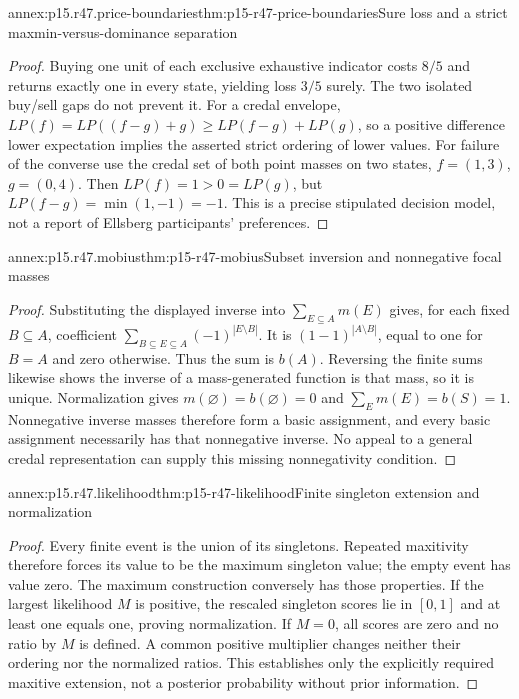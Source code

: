 \begin{annexitem}{annex:p15.r47.price-boundaries}{thm:p15-r47-price-boundaries}{Sure loss and a strict maxmin-versus-dominance separation}
\begin{proof}
Buying one unit of each exclusive exhaustive indicator costs \(8/5\)
and returns exactly one in every state, yielding loss \(3/5\) surely.
The two isolated buy/sell gaps do not prevent it. For a credal envelope,
\(LP(f)=LP((f-g)+g)\geq LP(f-g)+LP(g)\), so a positive difference
lower expectation implies the asserted strict ordering of lower values.
For failure of the converse use the credal set of both point masses on
two states, \(f=(1,3)\), \(g=(0,4)\). Then
\(LP(f)=1>0=LP(g)\), but \(LP(f-g)=\min(1,-1)=-1\).
This is a precise stipulated decision model, not a report of Ellsberg
participants' preferences.
\end{proof}\end{annexitem}

\begin{annexitem}{annex:p15.r47.mobius}{thm:p15-r47-mobius}{Subset inversion and nonnegative focal masses}
\begin{proof}
Substituting the displayed inverse into \(\sum_{E\subseteq A}m(E)\)
gives, for each fixed \(B\subseteq A\), coefficient
\(\sum_{B\subseteq E\subseteq A}(-1)^{|E\setminus B|}\).
It is \((1-1)^{|A\setminus B|}\), equal to one for \(B=A\) and
zero otherwise. Thus the sum is \(b(A)\). Reversing the finite sums
likewise shows the inverse of a mass-generated function is that mass,
so it is unique. Normalization gives \(m(\varnothing)=b(\varnothing)=0\)
and \(\sum_E m(E)=b(S)=1\). Nonnegative inverse masses therefore
form a basic assignment, and every basic assignment necessarily has
that nonnegative inverse. No appeal to a general credal representation
can supply this missing nonnegativity condition.
\end{proof}\end{annexitem}

\begin{annexitem}{annex:p15.r47.likelihood}{thm:p15-r47-likelihood}{Finite singleton extension and normalization}
\begin{proof}
Every finite event is the union of its singletons. Repeated maxitivity
therefore forces its value to be the maximum singleton value; the empty
event has value zero. The maximum construction conversely has those
properties. If the largest likelihood \(M\) is positive, the rescaled
singleton scores lie in \([0,1]\) and at least one equals one, proving
normalization. If \(M=0\), all scores are zero and no ratio by \(M\)
is defined. A common positive multiplier changes neither their ordering
nor the normalized ratios. This establishes only the explicitly required
maxitive extension, not a posterior probability without prior information.
\end{proof}\end{annexitem}
